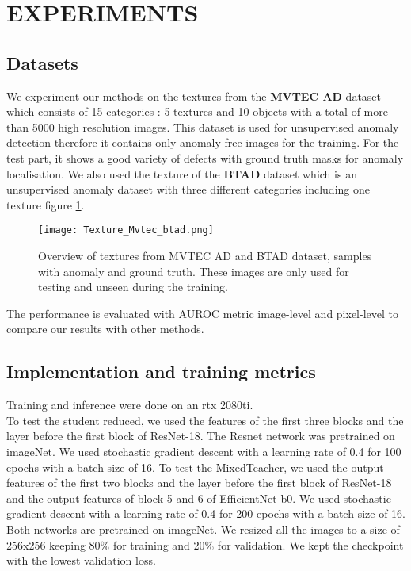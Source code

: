 \documentclass[a4paper,twoside]{article}
\begin{document}
\section{EXPERIMENTS}

\subsection{Datasets}
We experiment our methods on the textures from the  \textbf{MVTEC AD} \citep{bergmann_mvtec_2019} dataset which consists of 15 categories : 5 textures and 10 objects with a total of more than 5000 high resolution images. This dataset is used for unsupervised anomaly detection therefore it contains only anomaly free images for the training. For the test part, it shows a good variety of defects with ground truth masks for anomaly localisation. 
We also used the texture of the  \textbf{BTAD} \citep{mishra_vt-adl_2021} dataset which is an unsupervised anomaly dataset with three different categories including one texture figure \ref{Fig.4}.

\begin{figure}[h]
\centerline{\texttt{[image: Texture\_Mvtec\_btad.png]}}
\renewcommand{\arraystretch}{1}
\captionsetup{justification=centering}
\caption{ 
Overview of textures from MVTEC AD and BTAD dataset, samples with anomaly and ground truth. These images are only used for testing and unseen during the training.}
\label{Fig.4}
\end{figure}


The performance is evaluated with AUROC metric image-level and pixel-level to compare our results with other methods. 



\subsection{Implementation and training metrics}
Training and inference were done on an rtx 2080ti. \\
To test the student reduced, we used the features of the first three blocks and the layer before the first block of ResNet-18. The Resnet network was pretrained on imageNet. We used stochastic gradient descent with a learning rate of 0.4 for 100 epochs with a batch size of 16. To test the MixedTeacher, we used the output features of the first two blocks and the layer before the first block of ResNet-18 and the output features of block 5 and 6 of EfficientNet-b0. We used stochastic gradient descent with a learning rate of 0.4 for 200 epochs with a batch size of 16. Both networks are pretrained on imageNet.
We resized all the images to a size of 256x256 keeping 80\% for training and 20\% for validation. We kept the checkpoint with the lowest validation loss.
\end{document}
